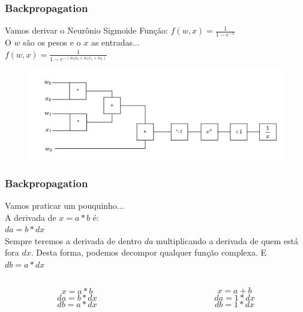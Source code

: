 \documentclass{beamer}
\begin{document}
\begin{frame}
	\frametitle{Backpropagation}
	\begin{block}{Vamos derivar o Neurônio Sigmoide}
		Função:
		$f(w, x) = \frac{1}{1-e^{-x}}$ \\ 
		O $w$ são os pesos e o $x$ as entradas... \\
		$f(w, x) = \frac{1}{1-e^{-(w_0x_0 + w_1x_1 + w_2)}}$
		\begin{figure}
			\centering
			\includegraphics[width=0.7\linewidth]{figures/sigmoidneuron_derivative}
		\end{figure}
		
	\end{block}
\end{frame}
\begin{frame}
	\frametitle{Backpropagation}
	\begin{example}
		Vamos praticar um pouquinho... \\
		A derivada de $x = a * b$ é: \\
		$da = b * dx$ \\
		Sempre teremos a derivada de dentro \alert{$da $} multiplicando a derivada de quem está fora \alert{$dx$}. Desta forma, podemos decompor qualquer função complexa. E $db = a * dx$
		\begin{columns}
			\begin{column}{0.35\textwidth}
				 $$x = a * b$$ 
				$$da = b * dx$$ 
				$$db = a * dx$$ 
			\end{column}
			\begin{column}{0.35\textwidth}
				$$x = a + b$$ 
				$$da = 1 * dx$$ 
				$$db = 1 * dx$$ 
			\end{column}
		\end{columns}
	\end{example}
\end{frame}
\end{document}
